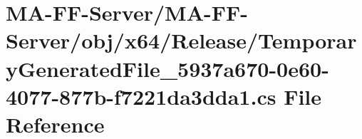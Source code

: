 \hypertarget{x64_2_release_2_temporary_generated_file__5937a670-0e60-4077-877b-f7221da3dda1_8cs}{}\section{M\+A-\/\+F\+F-\/\+Server/\+M\+A-\/\+F\+F-\/\+Server/obj/x64/\+Release/\+Temporary\+Generated\+File\+\_\+5937a670-\/0e60-\/4077-\/877b-\/f7221da3dda1.cs File Reference}
\label{x64_2_release_2_temporary_generated_file__5937a670-0e60-4077-877b-f7221da3dda1_8cs}
